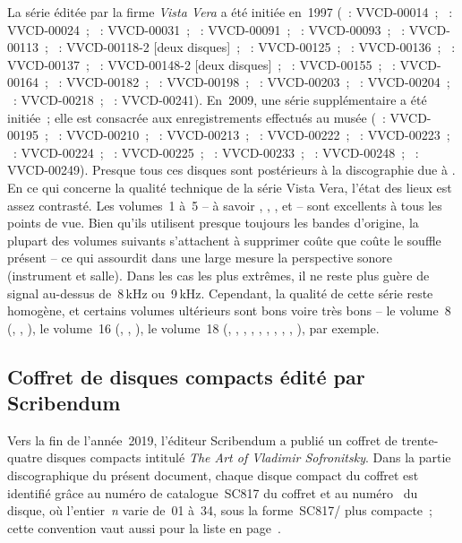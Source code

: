 La série éditée par la firme \emph{Vista Vera} \citep[voir][]{VistaVera} a
été initiée en~1997 (~: VVCD-00014~; ~: VVCD-00024~;
~: VVCD-00031~; ~: VVCD-00091~; ~:
VVCD-00093~; ~: VVCD-00113~; ~: VVCD-00118-2 [deux
disques]~; ~: VVCD-00125~; ~: VVCD-00136~; ~:
VVCD-00137~; ~: VVCD-00148-2 [deux disques]~; ~:
VVCD-00155~; ~: VVCD-00164~; ~: VVCD-00182~;
~: VVCD-00198~; ~: VVCD-00203~; ~:
VVCD-00204~; ~: VVCD-00218~; ~: VVCD-00241).
En~2009, une série supplémentaire a été initiée~; elle est consacrée aux
enregistrements effectués au musée \Scriabine{} (~: VVCD-00195~;
~: VVCD-00210~; ~: VVCD-00213~; ~:
VVCD-00222~; ~: VVCD-00223~; ~: VVCD-00224~;
~: VVCD-00225~; ~: VVCD-00233~; ~:
VVCD-00248~; ~: VVCD-00249).
Presque tous ces disques sont postérieurs à la discographie due à
\FMalik{} \citep[voir][]{Malik}.
En ce qui concerne la qualité technique de la série Vista Vera, l'état des
lieux est assez contrasté.
Les volumes~1 à~5 -- à savoir \Scriabine{}, \Schumann{}, \Schubert{},
\Rachmaninov{} et \Scriabine{} -- sont excellents à tous les points de vue.
Bien qu'ils utilisent presque toujours les bandes d'origine, la plupart des
volumes suivants s'attachent à supprimer coûte que coûte le souffle présent
-- ce qui assourdit dans une large mesure la perspective sonore (instrument
et salle).
Dans les cas les plus extrêmes, il ne reste plus guère de signal au-dessus
de~8\,kHz ou~9\,kHz.
Cependant, la qualité de cette série reste homogène, et certains volumes
ultérieurs sont bons voire très bons -- le volume~8 (\Beethoven{},
\Schubert{}, \Chopin{}), le volume~16 (\Schubert{}, \Schumann{}, \Chopin{}),
le volume~18 (\Borodine{}, \Liadov{}, \Rachmaninov{}, \Scriabine{},
\Prokofiev{}, \Kabalevski{}, \Goltz{}, \Mendelssohn{}, \Debussy{},
\Chopin{}), par exemple.

\subsection{Coffret de disques compacts édité par Scribendum}

Vers la fin de l'année~2019, l'éditeur Scribendum a publié un coffret de
trente-quatre disques compacts intitulé \foreignlanguage{english}{\emph{The
Art of Vladimir Sofronitsky}}.
Dans la partie discographique du présent document, chaque disque compact du
coffret est identifié grâce au numéro de catalogue~SC817 du coffret et au
numéro~ du disque, où l'entier~\textit{n} varie de~01 à~34, sous
la forme~SC817/ plus compacte~; cette convention vaut aussi pour
la liste en page~\pageref{chap:Contenu}.


